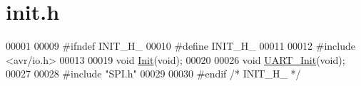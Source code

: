 \hypertarget{init_8h_source}{}\section{init.\+h}
\label{init_8h_source}

\begin{DoxyCode}
00001 
00009 \textcolor{preprocessor}{#ifndef INIT\_H\_}
00010 \textcolor{preprocessor}{#define INIT\_H\_}
00011 
00012 \textcolor{preprocessor}{#include <avr/io.h>}
00013 
00019 \textcolor{keywordtype}{void} \hyperlink{init_8h_a7ce0a14b6e7779fbb2d9a05333792c41}{Init}(\textcolor{keywordtype}{void});
00020 
00026 \textcolor{keywordtype}{void} \hyperlink{init_8h_ad5cbed2a2222bb84e8b5c1caaa50634e}{UART\_Init}(\textcolor{keywordtype}{void});
00027 
00028 \textcolor{preprocessor}{#include "SPI.h"}
00029 
00030 \textcolor{preprocessor}{#endif }\textcolor{comment}{/* INIT\_H\_ */}\textcolor{preprocessor}{}
\end{DoxyCode}
